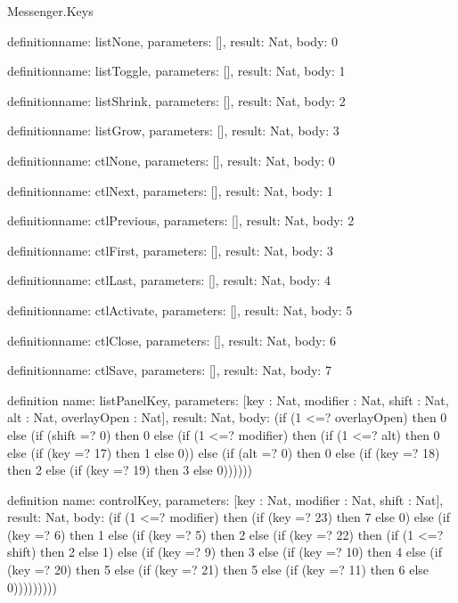 \begin{lexlean}{Messenger.Keys}
\begin{semanticmodule}
definition{name: listNone, parameters: [], result: Nat, body: 0}

definition{name: listToggle, parameters: [], result: Nat, body: 1}

definition{name: listShrink, parameters: [], result: Nat, body: 2}

definition{name: listGrow, parameters: [], result: Nat, body: 3}

definition{name: ctlNone, parameters: [], result: Nat, body: 0}

definition{name: ctlNext, parameters: [], result: Nat, body: 1}

definition{name: ctlPrevious, parameters: [], result: Nat, body: 2}

definition{name: ctlFirst, parameters: [], result: Nat, body: 3}

definition{name: ctlLast, parameters: [], result: Nat, body: 4}

definition{name: ctlActivate, parameters: [], result: Nat, body: 5}

definition{name: ctlClose, parameters: [], result: Nat, body: 6}

definition{name: ctlSave, parameters: [], result: Nat, body: 7}

definition{
  name: listPanelKey,
  parameters: [key : Nat, modifier : Nat, shift : Nat, alt : Nat, overlayOpen : Nat],
  result: Nat,
  body: (if (1 <=? overlayOpen) then 0 else (if (shift =? 0) then 0 else (if (1 <=? modifier) then (if (1 <=? alt) then 0 else (if (key =? 17) then 1 else 0)) else (if (alt =? 0) then 0 else (if (key =? 18) then 2 else (if (key =? 19) then 3 else 0))))))
}

definition{
  name: controlKey,
  parameters: [key : Nat, modifier : Nat, shift : Nat],
  result: Nat,
  body: (if (1 <=? modifier) then (if (key =? 23) then 7 else 0) else (if (key =? 6) then 1 else (if (key =? 5) then 2 else (if (key =? 22) then (if (1 <=? shift) then 2 else 1) else (if (key =? 9) then 3 else (if (key =? 10) then 4 else (if (key =? 20) then 5 else (if (key =? 21) then 5 else (if (key =? 11) then 6 else 0)))))))))
}
\end{semanticmodule}
\end{lexlean}
